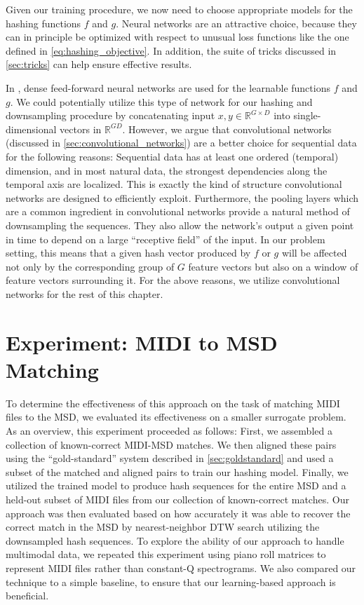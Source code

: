 Given our training procedure, we now need to choose appropriate models for the hashing functions $f$ and $g$.
Neural networks are an attractive choice, because they can in principle be optimized with respect to unusual loss functions like the one defined in \cref{eq:hashing_objective}.
In addition, the suite of tricks discussed in \cref{sec:tricks} can help ensure effective results.

In \cite{masci2014multimodal}, dense feed-forward neural networks are used for the learnable functions $f$ and $g$.
We could potentially utilize this type of network for our hashing and downsampling procedure by concatenating input $x, y \in \mathbb{R}^{G \times D}$ into single-dimensional vectors in $\mathbb{R}^{GD}$.
However, we argue that convolutional networks (discussed in \cref{sec:convolutional_networks}) are a better choice for sequential data for the following reasons:
Sequential data has at least one ordered (temporal) dimension, and in most natural data, the strongest dependencies along the temporal axis are localized.
This is exactly the kind of structure convolutional networks are designed to efficiently exploit.
Furthermore, the pooling layers which are a common ingredient in convolutional networks provide a natural method of downsampling the sequences.
They also allow the network's output a given point in time to depend on a large ``receptive field'' of the input.
In our problem setting, this means that a given hash vector produced by $f$ or $g$ will be affected not only by the corresponding group of $G$ feature vectors but also on a window of feature vectors surrounding it.
For the above reasons, we utilize convolutional networks for the rest of this chapter.

\section{Experiment: MIDI to MSD Matching}
\label{sec:dhs_experiment}

To determine the effectiveness of this approach on the task of matching MIDI files to the MSD, we evaluated its effectiveness on a smaller surrogate problem.
As an overview, this experiment proceeded as follows:
First, we assembled a collection of known-correct MIDI-MSD matches.
We then aligned these pairs using the ``gold-standard'' system described in \cref{sec:goldstandard} and used a subset of the matched and aligned pairs to train our hashing model.
Finally, we utilized the trained model to produce hash sequences for the entire MSD and a held-out subset of MIDI files from our collection of known-correct matches.
Our approach was then evaluated based on how accurately it was able to recover the correct match in the MSD by nearest-neighbor DTW search utilizing the downsampled hash sequences.
To explore the ability of our approach to handle multimodal data, we repeated this experiment using piano roll matrices to represent MIDI files rather than constant-Q spectrograms.
We also compared our technique to a simple baseline, to ensure that our learning-based approach is beneficial.


